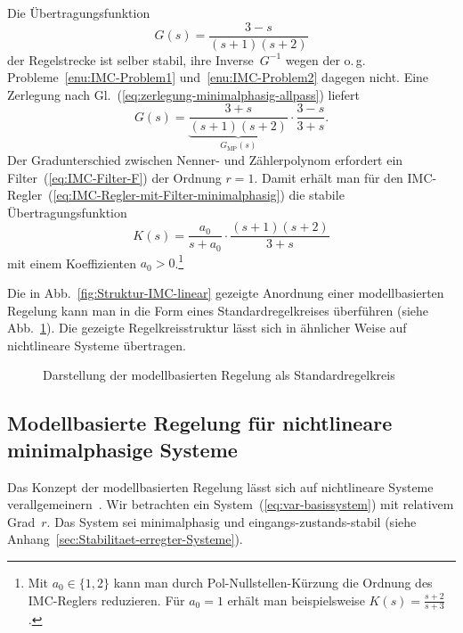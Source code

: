 \begin{example}
\label{exa:IMC-linear}Die Übertragungsfunktion
\[
G(s)=\frac{3-s}{(s+1)(s+2)}
\]
der Regelstrecke ist selber stabil, ihre Inverse~$G^{-1}$ wegen
der o.\,g. Probleme~\ref{enu:IMC-Problem1} und~\ref{enu:IMC-Problem2}
dagegen nicht. Eine Zerlegung nach Gl.~(\ref{eq:zerlegung-minimalphasig-allpass})
liefert 
\[
G(s)=\underbrace{\frac{3+s}{(s+1)(s+2)}}_{{\displaystyle G_{\text{MP}}(s)}}\cdot\frac{3-s}{3+s}.
\]
Der Gradunterschied zwischen Nenner- und Zählerpolynom erfordert ein
Filter~(\ref{eq:IMC-Filter-F}) der Ordnung $r=1$. Damit erhält
man für den IMC-Regler~(\ref{eq:IMC-Regler-mit-Filter-minimalphasig})
die stabile Übertragungsfunktion
\[
K(s)=\frac{a_{0}}{s+a_{0}}\cdot\frac{(s+1)(s+2)}{3+s}
\]
mit einem Koeffizienten $a_{0}>0$.\footnote{Mit $a_{0}\in\{1,2\}$ kann man durch Pol-Nullstellen-Kürzung die
Ordnung des IMC-Reglers reduzieren. Für $a_{0}=1$ erhält man beispielsweise
$K(s)=\frac{s+2}{s+3}$.}
\end{example}

Die in Abb.~\ref{fig:Struktur-IMC-linear} gezeigte Anordnung einer
modellbasierten Regelung kann man in die Form eines Standardregelkreises
überführen (siehe Abb.~\ref{fig:IMC-linear-Standardregelkreis}).
Die gezeigte Regel\-kreis\-struktur lässt sich in ähnlicher Weise
auf nichtlineare Systeme übertragen.

\begin{figure}
\begin{centering}
\resizebox{0.8\textwidth}{!}{}
\par\end{centering}
\caption{Darstellung der modellbasierten Regelung als Standardregelkreis\label{fig:IMC-linear-Standardregelkreis}}
\end{figure}


\subsection{Modellbasierte Regelung für nichtlineare minimalphasige Systeme\label{subsec:Modellbasierte-Regelung-nichtlinear-minimalphasig}}

Das Konzept der modellbasierten Regelung lässt sich auf nichtlineare
Systeme verallgemeinern~\cite{economou1986,henson1991,schwarzmann2006,schwarzmann2007}.
Wir betrachten ein System~(\ref{eq:var-basissystem}) mit relativem
Grad~$r$. Das System sei minimalphasig und eingangs-zustands-stabil
(siehe Anhang~\ref{sec:Stabilitaet-erregter-Systeme}). 

